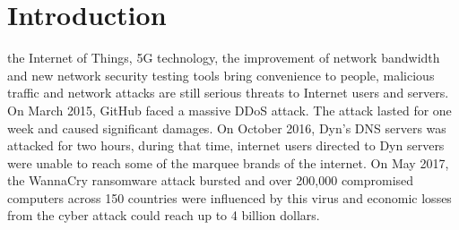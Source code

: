 \documentclass[journal]{IEEEtran}
\begin{document}
%
\IEEEpeerreviewmaketitle




% 
% 
% 
% 


\section{Introduction}
\label{sec:introduction}
 the Internet of Things, 5G technology, the improvement of network bandwidth and new network security testing tools bring convenience to people, malicious traffic and network attacks are still serious threats to Internet users and servers. 
On March 2015, GitHub faced a massive DDoS attack. The attack lasted for one week and caused significant damages\cite{github-2015}. On October 2016, Dyn's DNS servers was attacked for two hours, during that time, internet users directed to Dyn servers were unable to reach some of the marquee brands of the internet\cite{dyn-2016}. On May 2017, the WannaCry ransomware attack bursted and over 200,000 compromised computers across 150 countries were influenced by this virus and economic losses from the cyber attack could reach up to 4 billion dollars\cite{wannacry-2017}.
\end{document}
